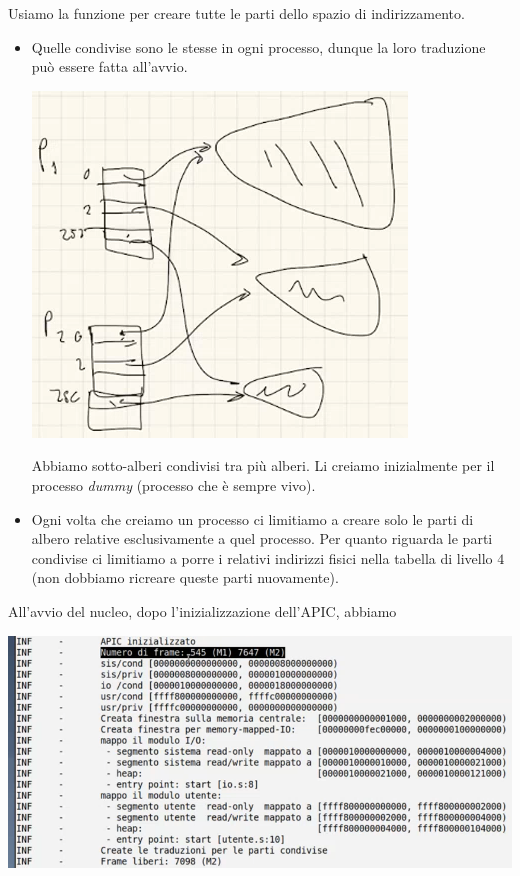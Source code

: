 \documentclass[11pt]{report}
\theoremstyle{definition}
\begin{document}
\begin{itemize}
	Usiamo la funzione per creare tutte le parti dello spazio di indirizzamento. 
	\begin{itemize}
		\item Quelle condivise sono le stesse in ogni processo, dunque la loro traduzione può essere fatta all'avvio. 
		\begin{center}
			\includegraphics[scale=.75]{img/265.PNG}
		\end{center}
		Abbiamo sotto-alberi condivisi tra più alberi. Li creiamo inizialmente per il processo \emph{dummy} (processo che è sempre vivo). 
		\item Ogni volta che creiamo un processo ci limitiamo a creare solo le parti di albero relative esclusivamente  a quel processo. Per quanto riguarda le parti condivise ci limitiamo a porre i relativi indirizzi fisici nella tabella di livello $4$ (non dobbiamo ricreare queste parti nuovamente).
	\end{itemize}
	All'avvio del nucleo, dopo l'inizializzazione dell'APIC, abbiamo
	\begin{center}
		\includegraphics[scale=.8]{img/266.PNG}

\end{center}
\end{itemize}
\end{document}
